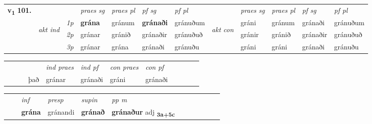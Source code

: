 \begin{tabular}{llllllllllll} \toprule
\multirow{4}{*}{{{\textbf{v{\textsubscript{1}}} \Large{\textbf{101.}}}}}  & &   &  \textit{praes sg}  & \textit{praes pl}  &\textit{ pf sg} & \textit{pf pl} &  &  \textit{praes sg}  & \textit{praes pl}  & \textit{pf sg} & \textit{pf pl } \\*
	\cmidrule{4-7} \cmidrule{9-12}
 & \multirow{3}{*}{\begin{turn}{90}\textit{akt ind}\end{turn}} & {\textit{1p}} & \textbf{grána} & gránum    & \textbf{gránaði} & gránuðum & \multirow{3}{*}{\begin{turn}{90}\textit{akt con}\end{turn}} &gráni & gránum & gránaði & gránuðum\\*
& &  {\textit{2p}} &  gránar  & gránið   & gránaðir & gránuðuð & & gránir & gránið & gránaðir & gránuðuð \\*
& &  {\textit{3p}} & gránar & grána   & gránaði & gránuðu & & gráni & gráni& gránaði & gránuðu  \\*
\cmidrule{4-7} \cmidrule{9-12}
\end{tabular}


\begin{tabular}{llllllllllll}
 & &  & &  \textit{ind praes} & \textit{ind pf} & \textit{con praes} & \textit{con pf} \\*
&  & & það & gránar & gránaði & gráni & gránaði \\*
\cmidrule{5-9}
\end{tabular}


\begin{tabular}{llllllllllll}
 & & \textit{inf}     & \textit{presp} & \textit{supin}  & \textit{pp m}     \\*
  & & \textbf{grána}      & gránandi &  \textbf{gránað}  & \textbf{gránaður} adj \textbf{\textsubscript{3a+5c}} \\*
\cmidrule{1-12}
\end{tabular}



